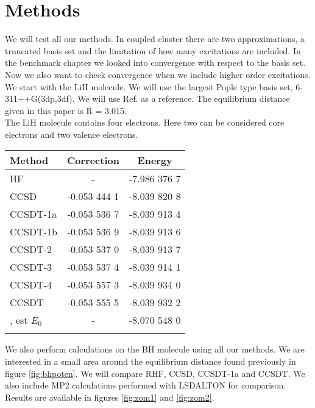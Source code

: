 \section{Methods}
We will test all our methods. In coupled cluster there are two approximations, a truncated basis set and the limitation of how many excitations are included. In the benchmark chapter we looked into convergence with respect to the basis set. Now we also want to check convergence when we include higher order excitations. \\

We start with the LiH molecule. We will use the largest Pople type basis set, 6-311++G(3dp,3df). We will use Ref.\cite{very_accurate_lih_poten} as a reference. The equilibrium distance given in this paper is R = 3.015. \\

The LiH molecule contains four electrons. Here two can be considered core electrons and two valence electrons. 
 
\begin{center}
\begin{tabular}{ l c c}
	\hline
  	Method & Correction & Energy \\ \hline
  	HF & - &  -7.986 376 7\\
  	CCSD     &  -0.053 444 1  & -8.039 820 8 \\ 
    CCSDT-1a &  -0.053 536 7  & -8.039 913 4 \\ 
  	CCSDT-1b &  -0.053 536 9  & -8.039 913 6 \\
  	CCSDT-2  &  -0.053 537 0  & -8.039 913 7        \\ 
  	CCSDT-3  &  -0.053 537 4  & -8.039 914 1        \\ 
  	CCSDT-4  &  -0.053 557 3  & -8.039 934 0    \\ 
  	CCSDT    &  -0.053 555 5  &  -8.039 932 2    \\ 
  	\cite{very_accurate_lih_poten}, est $E_0$ & - & -8.070 548 0 \\ \hline
  	\\
	\end{tabular}
\end{center}

We also perform calculations on the BH molecule using all our methods. We are interested in a small area around the equilibrium distance found previously in figure \ref{fig:bhpoten}. We will compare RHF, CCSD, CCSDT-1a and CCSDT. We also include MP2 calculations performed with LSDALTON for comparison. Results are available in figures \ref{fig:zom1} and \ref{fig:zom2}. 

